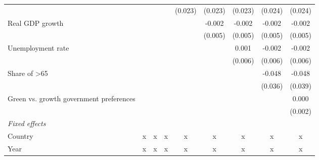 \begin{table}[htbp]
\begin{tabular}{lcccccccc}
                                                                                       &         &         &                & (0.023)        & (0.023)        & (0.023)        & (0.024)        & (0.024)\\   
      Real GDP growth                                                                  &         &         &                &                & -0.002         & -0.002         & -0.002         & -0.002\\   
                                                                                       &         &         &                &                & (0.005)        & (0.005)        & (0.005)        & (0.005)\\   
      Unemployment rate                                                                &         &         &                &                &                & 0.001          & -0.002         & -0.002\\   
                                                                                       &         &         &                &                &                & (0.006)        & (0.006)        & (0.006)\\   
      Share of >65                                                                     &         &         &                &                &                &                & -0.048         & -0.048\\   
                                                                                       &         &         &                &                &                &                & (0.036)        & (0.039)\\   
      Green vs. growth government preferences                                          &         &         &                &                &                &                &                & 0.000\\   
                                                                                       &         &         &                &                &                &                &                & (0.002)\\   
      \emph{Fixed effects}\\
      Country                                                                          & x       & x       & x              & x              & x              & x              & x              & x\\  
      Year                                                                             & x       & x       & x              & x              & x              & x              & x              & x\\  

\end{tabular}
\end{table}
